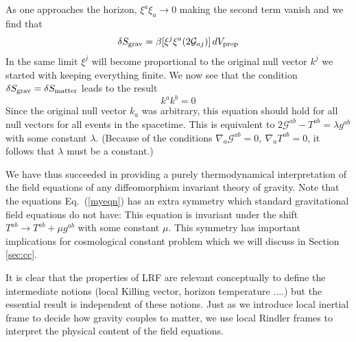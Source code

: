 \documentclass[12pt]{iopart}
\def\eq#1{{Eq.~(\ref{#1})}}
\begin{document}
As one approaches the horizon, $\xi^a\xi_a\to 0$ making the second term vanish and we find that
\begin{equation}
\delta S_{\rm grav} = \beta  [\xi^j \xi^a (2\mathcal{G}_{aj})] \, dV_{\rm prop}
\end{equation}
In the same limit $\xi^j$ will become proportional to the original null vector $k^j$ we started with keeping everything finite.   
We now see that the condition $\delta S_{\rm grav} = \delta S_{\rm matter}$ leads
to the result
\begin{equation}
 [2\mathcal{G}_{ab} - T_{ab}]k^ak^b =0
 \label{myeqn}
\end{equation} 
Since the original null vector $k_a$ was arbitrary, this equation should hold for all
null vectors for all events in the spacetime.
This is equivalent to $2\mathcal{G}^{ab} - T^{ab}=\lambda g^{ab}$ with some constant $\lambda$.
(Because of the conditions $\nabla_a\mathcal{G}^{ab}=0,\ \nabla_a T^{ab}=0$,
it follows that 
$\lambda$ must be a constant.)

 We have thus succeeded in providing a purely thermodynamical interpretation of the 
 field equations of any diffeomorphism invariant theory of gravity. Note that the equations 
 \eq{myeqn} has an extra symmetry
 which standard gravitational field equations do not have: This equation is  invariant
 under the shift $T^{ab}\to T^{ab}+\mu g^{ab}$ with some constant $\mu$. This symmetry has important implications for cosmological constant problem which we will discuss in Section \ref{sec:cc}. 
 
 It is clear that the properties of LRF are relevant conceptually to define the intermediate notions (local Killing vector, horizon temperature ....) but the essential result is independent of these notions. Just as we introduce local inertial frame to decide how gravity couples to matter, we use local Rindler frames to interpret the physical content of the field equations. 
 
 
   
\end{document}
